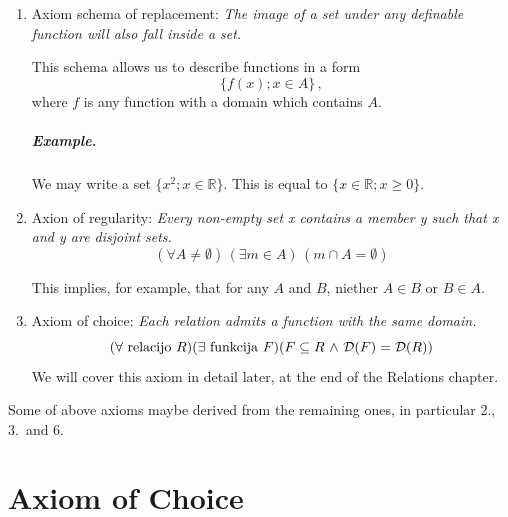 \documentclass[11pt,paper=b5,footinclude,headinclude]{scrbook} %
\def\inn {{~\wedge~}}
\def\sledi {{~\Rightarrow~}}
\def\cee {{~\Leftrightarrow~}}
\theoremstyle{remark}
\theoremstyle{definition} %
\theoremstyle{theorem} %
\begin{document}
\begin{enumerate}
	
	\item Axiom schema of replacement: \emph{ The image of a set under any definable function will also fall inside a set.}
	
	This schema allows us to describe functions in a form
	$$\{f(x); x\in A\}\,,$$
	where $f$ is any function with a domain which contains $A$.
	
	\paragraph{Example.} We may write a set $\{x^2; x\in \mathbb{R}\}$. This is equal to $\{x\in \mathbb{R}; x\ge 0\}$.
	
	
	\item Axion of regularity: \emph{ Every non-empty set x contains a member y such that x and y are disjoint sets.}
	$$(\forall A\neq \emptyset)\,(\exists m\in A)\,(m\cap A = \emptyset)$$
	
	This implies, for example, that for any $A$ and $B$,  niether $A\in B$ or $B\in A$.


	\item Axiom of choice: \emph{ Each relation admits a function with the same domain.}
	$$(\forall \textrm{ relacijo }R)(\exists \textrm{ funkcija }F)(F\subseteq R \inn {\cal D}(F) = {\cal D}(R))$$
	We will cover this axiom in detail later, at the end of the Relations chapter.
\end{enumerate}
\noindent Some of above axioms maybe derived from the remaining ones, in particular 2., 3.~and 6.

\chapter{Axiom of Choice}
\end{document}
